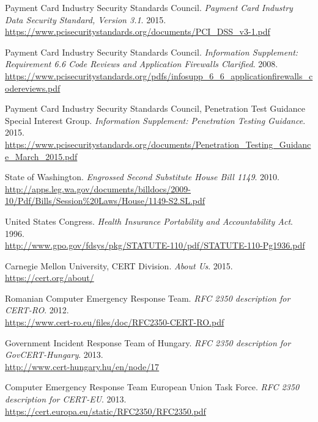 \documentclass[a4paper,12pt]{article}
\begin{document}
\begin{thebibliography}{}
		Payment Card Industry Security Standards Council. \textit{Payment Card Industry Data Security Standard, Version 3.1}. 2015.\\
		\url{https://www.pcisecuritystandards.org/documents/PCI_DSS_v3-1.pdf}
		
		Payment Card Industry Security Standards Council. \textit{Information Supplement: Requirement 6.6 Code Reviews and Application Firewalls Clarified}. 2008.\\
		\url{https://www.pcisecuritystandards.org/pdfs/infosupp_6_6_applicationfirewalls_codereviews.pdf}
		
		Payment Card Industry Security Standards Council, Penetration Test Guidance Special Interest Group. \textit{Information Supplement: Penetration Testing Guidance}. 2015.\\
		\url{https://www.pcisecuritystandards.org/documents/Penetration_Testing_Guidance_March_2015.pdf}
		
		State of Washington. \textit{Engrossed Second Substitute House Bill 1149}. 2010.\\
		\url{http://apps.leg.wa.gov/documents/billdocs/2009-10/Pdf/Bills/Session\%20Laws/House/1149-S2.SL.pdf}
		
		United States Congress. \textit{Health Insurance Portability and Accountability Act}. 1996.\\
		\url{http://www.gpo.gov/fdsys/pkg/STATUTE-110/pdf/STATUTE-110-Pg1936.pdf}
		
		Carnegie Mellon University, CERT Division. \textit{About Us}. 2015.\\
		\url{https://cert.org/about/}
		
		Romanian Computer Emergency Response Team. \textit{RFC 2350 description for CERT-RO}. 2012.\\
		\url{https://www.cert-ro.eu/files/doc/RFC2350-CERT-RO.pdf}
		
		Government Incident Response Team of Hungary. \textit{RFC 2350 description for GovCERT-Hungary}. 2013.\\
		\url{http://www.cert-hungary.hu/en/node/17}
		
		Computer Emergency Response Team European Union Task Force. \textit{RFC 2350 description for CERT-EU}. 2013.\\
		\url{https://cert.europa.eu/static/RFC2350/RFC2350.pdf}
		

\end{thebibliography}
\end{document}
